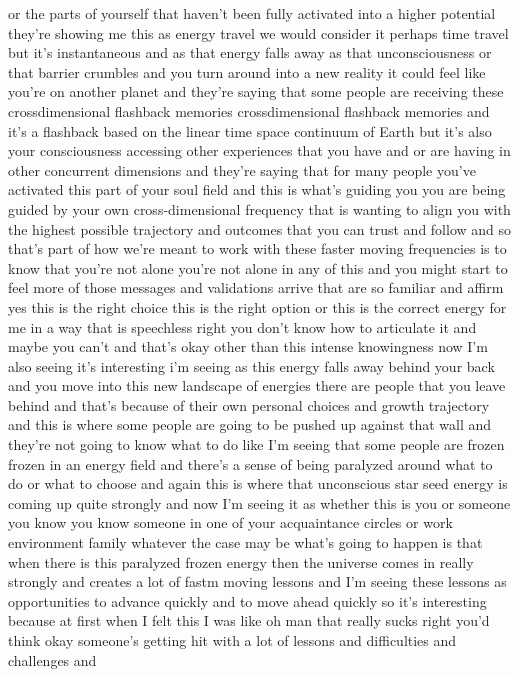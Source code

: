 \documentclass{article}
\begin{document}
or the parts of yourself that haven't been fully activated into a higher
potential they're showing me this as energy travel we would consider it
perhaps time travel but it's instantaneous and as that energy falls away
as that unconsciousness or that barrier crumbles and you turn around
into a new reality it could feel like you're on another planet and
they're saying that some people are receiving these crossdimensional
flashback memories crossdimensional flashback memories and it's a
flashback based on the linear time space continuum of Earth but it's
also your consciousness accessing other experiences that you have and or
are having in other concurrent dimensions and they're saying that for
many people you've activated this part of your soul field and this is
what's guiding you you are being guided by your own cross-dimensional
frequency that is wanting to align you with the highest possible
trajectory and outcomes that you can trust and follow and so that's part
of how we're meant to work with these faster moving frequencies is to
know that you're not alone you're not alone in any of this and you might
start to feel more of those messages and validations arrive that are so
familiar and affirm yes this is the right choice this is the right
option or this is the correct energy for me in a way that is speechless
right you don't know how to articulate it and maybe you can't and that's
okay other than this intense knowingness now I'm also seeing it's
interesting i'm seeing as this energy falls away behind your back and
you move into this new landscape of energies there are people that you
leave behind and that's because of their own personal choices and growth
trajectory and this is where some people are going to be pushed up
against that wall and they're not going to know what to do like I'm
seeing that some people are frozen frozen in an energy field and there's
a sense of being paralyzed around what to do or what to choose and again
this is where that unconscious star seed energy is coming up quite
strongly and now I'm seeing it as whether this is you or someone you
know you know someone in one of your acquaintance circles or work
environment family whatever the case may be what's going to happen is
that when there is this paralyzed frozen energy then the universe comes
in really strongly and creates a lot of fastm moving lessons and I'm
seeing these lessons as opportunities to advance quickly and to move
ahead quickly so it's interesting because at first when I felt this I
was like oh man that really sucks right you'd think okay someone's
getting hit with a lot of lessons and difficulties and challenges and
\end{document}
